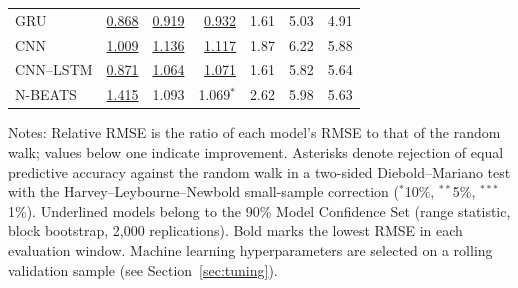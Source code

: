 \begin{table}[!ht]
\begin{tabular}{l rrr rrr}
\quad GRU & \underline{0.868} & \underline{0.919} & \underline{0.932} & 1.61 & 5.03 & 4.91\\
\quad CNN & \underline{1.009} & \underline{1.136} & \underline{1.117} & 1.87 & 6.22 & 5.88\\
\quad CNN--LSTM & \underline{0.871} & \underline{1.064} & \underline{1.071} & 1.61 & 5.82 & 5.64\\
\quad N-BEATS & \underline{1.415} & 1.093 & 1.069$^{*}$ & 2.62 & 5.98 & 5.63\\
\bottomrule\end{tabular}
\begin{minipage}{0.95\linewidth}\footnotesize\vspace{2pt} Notes: Relative RMSE is the ratio of each model’s RMSE to that of the random walk; values below one indicate improvement. Asterisks denote rejection of equal predictive accuracy against the random walk in a two-sided Diebold--Mariano test with the Harvey--Leybourne--Newbold small-sample correction ($^{*}$10\%, $^{**}$5\%, $^{***}$1\%). Underlined models belong to the 90\% Model Confidence Set (range statistic, block bootstrap, 2{,}000 replications). Bold marks the lowest RMSE in each evaluation window. Machine learning hyperparameters are selected on a rolling validation sample (see Section~\ref{sec:tuning}).\end{minipage}
\end{table}